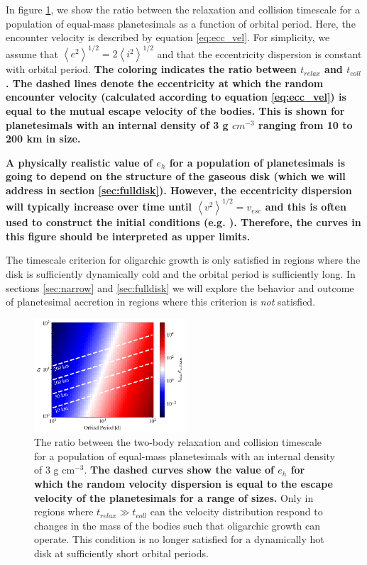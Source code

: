 \documentclass[twocolumn,linenumbers]{aastex63}
\begin{document}
In figure \ref{fig:timescales}, we show the ratio between the relaxation
and collision timescale for a population of equal-mass planetesimals
as a function of orbital period. Here, the encounter velocity is
described by equation \ref{eq:ecc_vel}. For
simplicity, we assume that $\left< e^2 \right>^{1/2} = 2\left< i^2
\right>^{1/2}$ \citep{ida93a} and that the eccentricity dispersion is
constant with orbital period. \textbf{The coloring indicates the ratio between
$t_{relax}$ and $t_{coll}$. The dashed lines denote the eccentricity at which the
random encounter velocity (calculated according to equation \ref{eq:ecc_vel}) is
equal to the mutual escape velocity of the bodies. This is shown for planetesimals
with an internal density of 3 g $cm^{-3}$ ranging from 10 to 200 km in size.}

\textbf{A physically realistic value of $e_{h}$ for a population of planetesimals is going to depend on the structure
of the gaseous disk (which we will address in section \ref{sec:fulldisk}). However, the eccentricity
dispersion will typically increase over time until $\left< v^{2} \right>^{1/2} = v_{esc}$ and this is
often used to construct the initial conditions (e.g. \citet{barnes09}). Therefore, the curves in this figure
should be interpreted as upper limits.}

The timescale criterion for oligarchic growth is only satisfied in regions where the
disk is sufficiently dynamically cold and the orbital period is
sufficiently long. In sections \ref{sec:narrow} and \ref{sec:fulldisk}
we will explore the behavior and outcome of planetesimal accretion in regions where this criterion is \textit{not} satisfied. 

\begin{figure}
\begin{center}
    \includegraphics[width=0.5\textwidth]{figures/timescales.png}
    \caption{The ratio between the two-body relaxation and collision
      timescale for a population of equal-mass planetesimals with an
      internal density of 3 g cm$^{-3}$. \textbf{The dashed curves show 
      the value of $e_{h}$ for which the random velocity dispersion is equal
      to the escape velocity of the planetesimals for a range of sizes.} Only
      in regions where $t_{relax} \gg t_{coll}$ can the velocity distribution 
      respond to changes in the mass of the bodies such that oligarchic 
      growth can operate. This condition is no longer satisfied for a 
      dynamically hot disk at sufficiently short orbital periods.\label{fig:timescales}}
\end{center}
\end{figure}
\end{document}
